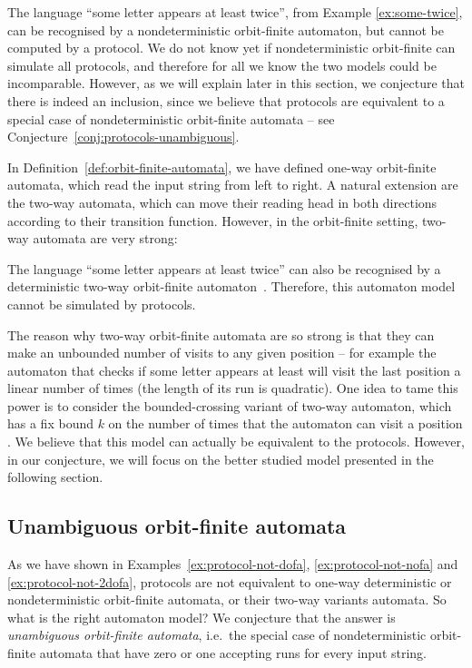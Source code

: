 \begin{myexample}
     \label{ex:protocol-not-nofa}  
    The language ``some letter appears at least twice'', from Example \ref{ex:some-twice}, can be recognised by a nondeterministic orbit-finite automaton, but cannot be computed by a protocol. We do not know yet if nondeterministic orbit-finite can simulate all protocols, and therefore for all we know the two models could be incomparable. However, as we will explain later in this section, we conjecture that there is indeed an inclusion, since we believe that protocols are equivalent to a special case of nondeterministic orbit-finite automata -- see Conjecture~\ref{conj:protocols-unambiguous}.
\end{myexample}

In Definition~\ref{def:orbit-finite-automata}, we have defined one-way orbit-finite automata, which read the input string from left to right. A natural extension are the two-way automata, which can move their reading head in both directions according to their transition
function. However, in the orbit-finite setting, two-way automata are very strong:

\begin{myexample}\label{ex:protocol-not-2dofa}
    The language ``some letter appears at least twice'' can also be recognised by a deterministic two-way orbit-finite automaton~\cite[Example 18]{bojanczyk_slightly}. Therefore, this automaton model cannot be simulated by protocols.

    The reason why two-way orbit-finite automata are so strong is that they can make an unbounded number of visits to any given position -- for example the automaton that checks if some letter appears at least will visit the last position a linear number of times
    (the length of its run is quadratic). One idea to tame this power is to consider the bounded-crossing variant of two-way automaton, 
    which has a fix bound $k$ on the number of times that the automaton can visit a position \cite[p.~92]{neven2003power}.
    We believe that this model can actually be equivalent to the protocols. However, in our conjecture, we will focus on the 
    better studied model presented in the following section.
\end{myexample}

\subsection{Unambiguous orbit-finite automata}
\label{sec:unambiguous-orbit-finite-automata}
As we have shown in Examples~\ref{ex:protocol-not-dofa}, \ref{ex:protocol-not-nofa} and \ref{ex:protocol-not-2dofa}, protocols are not equivalent to one-way deterministic or nondeterministic orbit-finite automata, or their two-way variants automata. So what is the right automaton model?  We conjecture that the answer is  \emph{unambiguous orbit-finite automata}, i.e.~the special case of nondeterministic orbit-finite automata that have zero or one accepting runs for every input string.

